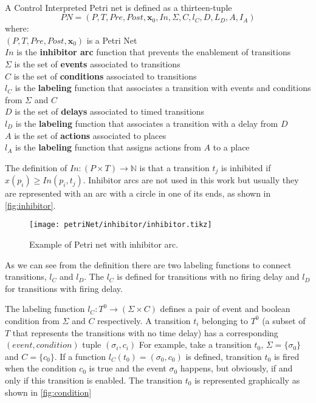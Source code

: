 \begin{definition}
  \label{def:cipn}~\\
  A Control Interpreted Petri net is defined as a thirteen-tuple
  \[PN = (P,T,Pre,Post,\mathbf{x}_0,In,\Sigma,C,l_C,D,L_D,A,I_A)\]
  where: \\
  \indent $(P,T,Pre,Post,\mathbf{x}_0)$ is a Petri Net\\
  \indent $In$ is the \textbf{inhibitor arc} function that prevents the
  enablement of transitions \\
  \indent $\Sigma$ is the set of \textbf{events} associated to transitions \\
  \indent $C$ is the set of \textbf{conditions} associated to transitions \\
  \indent $l_C$ is the \textbf{labeling} function that associates a transition
  with events and conditions from $\Sigma$ and $C$\\
  \indent $D$ is the set of \textbf{delays} associated to timed transitions \\
  \indent $l_D$ is the \textbf{labeling} function that associates a transition with a delay from $D$ \\
  \indent $A$ is the set of \textbf{actions} associated to places \\
  \indent $l_A$ is the \textbf{labeling} function that assigns actions from $A$ to a place \\
\end{definition}
The definition of $In : (P \times T )\rightarrow\mathbb{N}$ is that a transition
$t_j$ is inhibited if $x(p_i)\geq In(p_i,t_j)$. Inhibitor arcs are not used in
this work but usually they are represented with an arc with a circle in one of
its ends, as shown in \autoref{fig:inhibitor}.

\begin{figure}[H]
  \centering
  \texttt{[image: petriNet/inhibitor/inhibitor.tikz]}
  \caption{Example of Petri net with inhibitor arc.}
  \label{fig:inhibitor}
\end{figure}
As we can see from the definition there are two labeling functions to connect 
transitions, $l_C$ and $l_D$. The $l_C$ is defined for transitions with no
firing delay and $l_D$ for transitions with firing delay.

The labeling function $l_C : T^0\rightarrow(\Sigma \times C)$ defines a pair of
event and boolean condition from $\Sigma$ and $C$ respectively. A transition
$t_i$ belonging to $T^0$ (a subset of $T$ that represents the transitions with
no time delay) has a corresponding $(event, condition)$ tuple $(\sigma_i,c_i)$
For example, take a transition $t_0$, $\Sigma =\{\sigma_0\}$ and $C=\{c_0\}$. If
a function $l_C(t_0)=(\sigma_0,c_0)$ is defined, transition $t_0$ is fired
when the condition $c_0$ is true and the event $\sigma_0$
happens, but obviously, if and only if this transition is enabled.
The transition $t_0$ is represented graphically as shown in \autoref{fig:condition}

